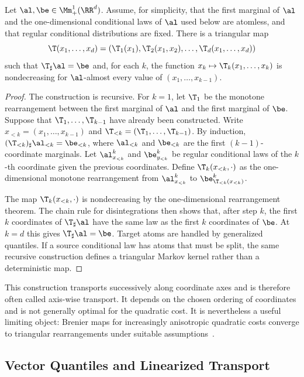 \begin{prop}\label{prop-knothe-rosenblatt}
	Let $\al,\be\in\Mm_+^1(\RR^d)$. Assume, for simplicity, that the first marginal of $\al$ and the one-dimensional conditional laws of $\al$ used below are atomless, and that regular conditional distributions are fixed. There is a triangular map
	\[
		\T(x_1,\ldots,x_d)
		=
		(\T_1(x_1),\T_2(x_1,x_2),\ldots,\T_d(x_1,\ldots,x_d))
	\]
	such that $\T_\sharp\al=\be$ and, for each $k$, the function $x_k\mapsto\T_k(x_1,\ldots,x_k)$ is nondecreasing for $\al$-almost every value of $(x_1,\ldots,x_{k-1})$.
\end{prop}
\begin{proof}
	The construction is recursive. For $k=1$, let $\T_1$ be the monotone rearrangement between the first marginal of $\al$ and the first marginal of $\be$. Suppose that $\T_1,\ldots,\T_{k-1}$ have already been constructed. Write $x_{<k}=(x_1,\ldots,x_{k-1})$ and $\T_{<k}=(\T_1,\ldots,\T_{k-1})$. By induction, $(\T_{<k})_\sharp\al_{<k}=\be_{<k}$, where $\al_{<k}$ and $\be_{<k}$ are the first $(k-1)$-coordinate marginals. Let $\al^k_{x_{<k}}$ and $\be^k_{y_{<k}}$ be regular conditional laws of the $k$-th coordinate given the previous coordinates. Define $\T_k(x_{<k},\cdot)$ as the one-dimensional monotone rearrangement from $\al^k_{x_{<k}}$ to $\be^k_{\T_{<k}(x_{<k})}$.

	The map $\T_k(x_{<k},\cdot)$ is nondecreasing by the one-dimensional rearrangement theorem. The chain rule for disintegrations then shows that, after step $k$, the first $k$ coordinates of $\T_\sharp\al$ have the same law as the first $k$ coordinates of $\be$. At $k=d$ this gives $\T_\sharp\al=\be$. Target atoms are handled by generalized quantiles. If a source conditional law has atoms that must be split, the same recursive construction defines a triangular Markov kernel rather than a deterministic map.
\end{proof}

This construction transports successively along coordinate axes and is therefore often called axis-wise transport. It depends on the chosen ordering of coordinates and is not generally optimal for the quadratic cost. It is nevertheless a useful limiting object: Brenier maps for increasingly anisotropic quadratic costs converge to triangular rearrangements under suitable assumptions~\cite{carlier2010knothe}.

\subsection{Vector Quantiles and Linearized Transport}
\label{sec-vector-quantiles-linearized-transport}

